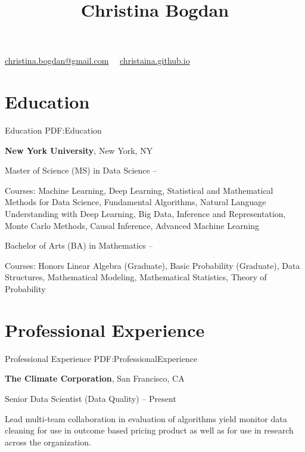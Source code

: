 \documentclass[letterpaper,9.5pt,oneside]{article}
\newcommand{\CVAuthor}{Christina Bogdan}
\begin{document}

\title{\CVAuthor}

\begin{subtitle}

\par
\href{mailto:christina.bogdan@gmail.com}
{christina.bogdan@gmail.com}
\, \SubBulletSymbol \, \url{christaina.github.io}
\end{subtitle}

\begin{body}


\section
{Education}
{Education}
{PDF:Education}


\textbf{New York University},
New York, NY

\GapNoBreak
Master of Science (MS) in
Data Science
\hfill
{} --
\begin{detail}
\BulletItem
Courses: Machine Learning, Deep Learning, Statistical and Mathematical Methods for Data Science, Fundamental Algorithms, Natural Language Understanding with Deep Learning, Big Data, Inference and Representation, Monte Carlo Methods, Causal Inference, Advanced Machine Learning
\end{detail}

\GapNoBreak
Bachelor of Arts (BA) in Mathematics
\hfill
{} --
\begin{detail}
\BulletItem
Courses: Honors Linear Algebra (Graduate), Basic Probability (Graduate), Data Structures, Mathematical Modeling, Mathematical Statistics, Theory of Probability
\end{detail}



\section
{Professional Experience}
{Professional Experience}
{PDF:ProfessionalExperience}


\textbf{The Climate Corporation},
San Francisco, CA

\GapNoBreak
Senior Data Scientist (Data Quality)
\hfill
{} --
Present 
\begin{detail}
\BulletItem Lead multi-team collaboration in evaluation of algorithms yield monitor data cleaning for use in outcome based pricing product as well as for use in research across the organization.
\end{detail}


\end{body}
\end{document}
